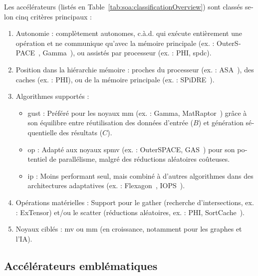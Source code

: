 \begin{otherlanguage}{french}
Les accélérateurs (listés en Table~\ref{tab:soa:classificationOverview}) sont classés selon cinq critères principaux :
\begin{enumerate}
    \item Autonomie : complètement autonomes, c.à.d. qui exécute entièrement une opération et ne communique qu'avec la mémoire principale (ex. : OuterSPACE~\cite{Pal2018_OuterSPACE}, Gamma~\cite{Zhang2021_Gamma}), ou assistés par processeur (ex. : PHI, \acrlong{spdc}).
    \item Position dans la hiérarchie mémoire : proches du processeur (ex. : ASA~\cite{Zhang2022_ASA}), des caches (ex. : PHI), ou de la mémoire principale (ex. : SPiDRE~\cite{Barredo2019_SPiDRE}).
    \item Algorithmes supportés :
    \begin{itemize}
        \item \acrfull{gust} : Préféré pour les noyaux \acrshort{mm} (ex. : Gamma, MatRaptor~\cite{Srivastava2020_MatRaptor}) grâce à son équilibre entre réutilisation des données d'entrée ($B$) et génération séquentielle des résultats ($C$).
        \item \acrfull{op} : Adapté aux noyaux \acrshort{spmv} (ex. : OuterSPACE, GAS~\cite{Zhang2024_GAS}) pour son potentiel de parallélisme, malgré des réductions aléatoires coûteuses.
        \item \acrfull{ip} : Moins performant seul, mais combiné à d'autres algorithmes dans des architectures adaptatives (ex. : Flexagon~\cite{Munoz-Martinez2023_Flexagon}, IOPS~\cite{Sun2025_IOPS}).
    \end{itemize}
    \item Opérations matérielles : Support pour le \gls{gather} (recherche d'intersections, ex. : ExTensor) et/ou le \gls{scatter} (réductions aléatoires, ex. : PHI, SortCache~\cite{Srikanth2021_SortCache}).
    \item Noyaux ciblés : \acrshort{mv} ou \acrshort{mm} (en croissance, notamment pour les graphes et l'IA).
\end{enumerate}

\subsection*{Accélérateurs emblématiques}


\end{otherlanguage}
